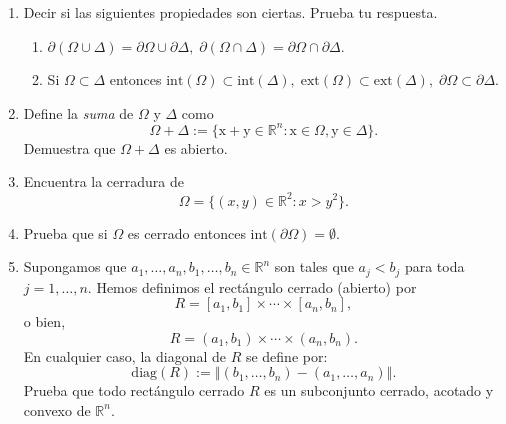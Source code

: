 \documentclass[12pt]{article}
\newcommand{\norm}[1]{\left\Vert#1\right\Vert}
\newcommand{\diag}{\mathrm{diag}}
\newcommand{\Ext}{\mathrm{ext}}
\newcommand{\Int}{\mathrm{int}}
\newcommand{\R}{\mathbb R}
\newcommand{\x}{\mathrm x}
\newcommand{\y}{\mathrm y}
\begin{document}
\begin{enumerate}
\item Decir si las siguientes propiedades son ciertas. Prueba tu respuesta.
\begin{enumerate}[(1)]
\item $\partial(\Omega\cup \Delta) = \partial \Omega\cup \partial \Delta,\; 
\partial(\Omega\cap \Delta) = \partial \Omega\cap \partial \Delta$.
\item Si $\Omega\subset \Delta$ entonces $\Int(\Omega)\subset \Int(\Delta),\; \Ext(\Omega)\subset \Ext(\Delta),\; \partial \Omega\subset \partial \Delta$.
\end{enumerate}

\item Define la \emph{suma} de $\Omega$ y $\Delta$ como
\[ \Omega + \Delta := \{ \x+\y\in \R^n : \x\in \Omega, \y\in \Delta \}. \]
Demuestra que $\Omega + \Delta$ es abierto.

\item Encuentra la cerradura de 
\[ \Omega = \{ (x,y)\in \R^2 : x > y^2 \}. \]

\item Prueba que si $\Omega$ es cerrado entonces 
$\Int(\partial \Omega)=\emptyset$.

\item Supongamos que $a_1,\ldots,a_n,b_1,\ldots,b_n\in \R^n$ son tales que $a_j<b_j$ para toda $j=1,\ldots,n$. Hemos definimos el rectángulo cerrado (abierto) por
\[ R = [a_1,b_1]\times \cdots\times [a_n,b_n], \]
o bien,
\[ R = (a_1,b_1)\times \cdots\times (a_n,b_n). \]
En cualquier caso, la \textsf{diagonal} de $R$ se define por:
\[ \diag(R) := \norm{(b_1,\ldots,b_n) - (a_1,\ldots,a_n)}. \]
Prueba que todo rectángulo cerrado $R$ es un subconjunto cerrado, acotado y convexo de $\R^n$. 

\end{enumerate}
\end{document}
